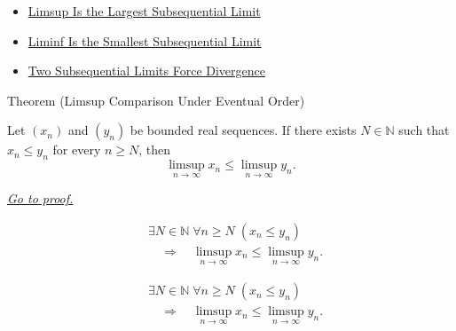 \begin{dependencies}
\begin{itemize}
  \item \hyperref[thm:limsup-largest-subsequential-limit]{Limsup Is the Largest Subsequential Limit}
  \item \hyperref[thm:liminf-smallest-subsequential-limit]{Liminf Is the Smallest Subsequential Limit}
  \item \hyperref[thm:two-subsequential-limits-force-divergence]{Two Subsequential Limits Force Divergence}
\end{itemize}
\end{dependencies}


\begin{theorembox}{Theorem (Limsup Comparison Under Eventual Order)}
\begin{theorem}
\label{thm:limsup-comparison-under-eventual-order}
Let $(x_n)$ and $(y_n)$ be bounded real sequences. If there exists
$N\in\mathbb{N}$ such that $x_n\le y_n$ for every $n\ge N$, then
\[
  \limsup_{n\to\infty}x_n
  \le
  \limsup_{n\to\infty}y_n.
\]

\smallskip
\noindent
\hyperref[prf:limsup-comparison-under-eventual-order]{\textit{Go to proof.}}
\end{theorem}
\end{theorembox}

\begin{remark*}
\[
\begin{aligned}
&\exists N\in\mathbb{N}\;\forall n\ge N\;(x_n\le y_n)\\
&\quad\Longrightarrow\quad
\limsup_{n\to\infty}x_n
\le
\limsup_{n\to\infty}y_n.
\end{aligned}
\]
\end{remark*}

\begin{remark*}
\[
\begin{aligned}
&\exists N\in\mathbb{N}\;\forall n\ge N\;(x_n\le y_n)\\
&\quad\Longrightarrow\quad
\limsup_{n\to\infty}x_n
\le
\limsup_{n\to\infty}y_n.
\end{aligned}
\]
\end{remark*}

